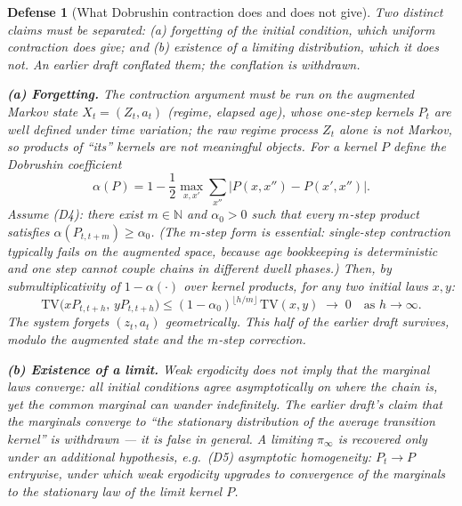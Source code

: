 \documentclass[11pt,a4paper]{article}
\newtheorem{defense}{Defense}
\begin{document}
\begin{defense}[What Dobrushin contraction does and does not give]
Two distinct claims must be separated: (a) \emph{forgetting} of the initial condition, which uniform contraction does give; and (b) \emph{existence of a limiting distribution}, which it does not. An earlier draft conflated them; the conflation is withdrawn. %

\textbf{(a) Forgetting.} The contraction argument must be run on the augmented Markov state $X_t = (Z_t, a_t)$ (regime, elapsed age), whose one-step kernels $P_t$ are well defined under time variation; the raw regime process $Z_t$ alone is not Markov, so products of ``its'' kernels are not meaningful objects. For a kernel $P$ define the Dobrushin coefficient %
\[
\alpha(P) = 1 - \frac{1}{2} \max_{x, x'} \sum_{x''} |P(x, x'') - P(x', x'')|.
\]
Assume (D4): there exist $m \in \mathbb{N}$ and $\alpha_0 > 0$ such that every $m$-step product satisfies $\alpha(P_{t, t+m}) \ge \alpha_0$. (The $m$-step form is essential: single-step contraction typically fails on the augmented space, because age bookkeeping is deterministic and one step cannot couple chains in different dwell phases.) Then, by submultiplicativity of $1 - \alpha(\cdot)$ over kernel products, for any two initial laws $x, y$: %
\[
\text{TV}\big(x P_{t, t+h},\, y P_{t, t+h}\big) \le (1 - \alpha_0)^{\lfloor h/m \rfloor}\, \text{TV}(x, y) \;\to\; 0 \quad \text{as } h \to \infty. %
\]
The system forgets $(z_t, a_t)$ geometrically. This half of the earlier draft survives, modulo the augmented state and the $m$-step correction. %

\textbf{(b) Existence of a limit.} Weak ergodicity does \emph{not} imply that the marginal laws converge: all initial conditions agree asymptotically on where the chain is, yet the common marginal can wander indefinitely. The earlier draft's claim that the marginals converge to ``the stationary distribution of the average transition kernel'' is withdrawn --- it is false in general. A limiting $\pi_\infty$ is recovered only under an additional hypothesis, e.g.\ (D5) asymptotic homogeneity: $P_t \to P$ entrywise, under which weak ergodicity upgrades to convergence of the marginals to the stationary law of the limit kernel $P$. %


\end{defense}
\end{document}
